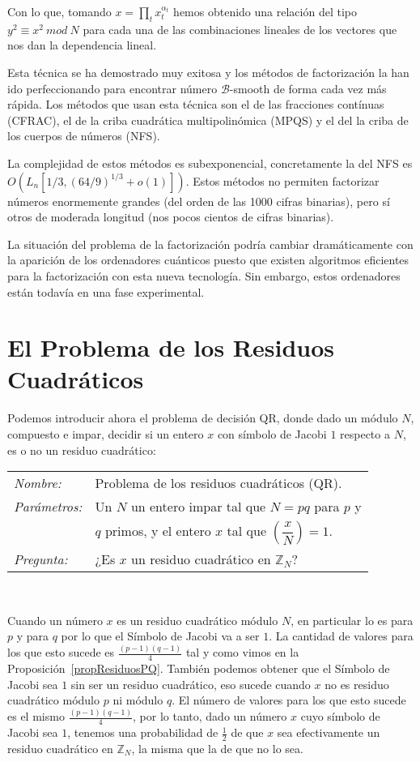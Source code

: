 Con lo que, tomando $x = \prod_t x_t^{\alpha_t}$ hemos obtenido una relaci\'on del tipo $y^2 \equiv x^2~mod~N$ para cada una de las combinaciones lineales de los
vectores que nos dan la dependencia lineal.

Esta t\'ecnica se ha demostrado muy exitosa y los m\'etodos de factorizaci\'on la han ido perfeccionando para encontrar n\'umero ${\mathcal B}$-smooth de forma cada
vez m\'as r\'apida. Los m\'etodos que usan esta t\'ecnica son el de las fracciones cont\'inuas (CFRAC), el de la criba cuadr\'atica multipolin\'omica (MPQS) y el del
la criba de los cuerpos de n\'umeros (NFS).

La complejidad de estos m\'etodos es subexponencial, concretamente la del NFS es $O(L_n[1/3,(64/9)^{1/3} + o(1)])$. Estos m\'etodos no permiten factorizar n\'umeros
enormemente grandes (del orden de las 1000 cifras binarias), pero s\'i otros de moderada longitud (nos pocos cientos de cifras binarias).

La situaci\'on del problema de la factorizaci\'on podr\'ia cambiar dram\'aticamente con la aparici\'on de los ordenadores cu\'anticos puesto que existen algoritmos
eficientes para la factorizaci\'on con esta nueva tecnolog\'ia. Sin embargo, estos ordenadores est\'an todav\'ia en una fase experimental.


\section{El Problema de los Residuos Cuadr\'aticos}

Podemos introducir ahora  el problema de decisión QR, donde dado un módulo $N$,
compuesto e impar, decidir si un entero $x$ con símbolo de Jacobi $1$ respecto
a $N$, es o no un residuo cuadrático:

\hfil

\begin{tabular}{|ll}
	\textit{Nombre:} & Problema de los residuos cuadr\'aticos (QR). \\
	\textit{Parámetros:} & Un $N$ un entero impar tal que $N = pq$ para $p$ y \\
	& $q$ primos, y el entero $x$ tal que $\left( \dfrac{x}{N} \right) = 1$. \\
	\textit{Pregunta:} & ¿Es $x$ un residuo cuadrático en ${\mathbb Z}_N$? \\
\end{tabular}
\\

\hfil

Cuando un n\'umero $x$ es un residuo cuadr\'atico m\'odulo $N$, en particular lo
es para $p$ y para $q$ por lo que el S\'imbolo de Jacobi va a ser $1$. La cantidad
de valores para los que esto sucede es $\frac{(p-1)(q-1)}{4}$ tal y como vimos en
la Proposici\'on~\ref{propResiduosPQ}. Tambi\'en podemos obtener que el S\'imbolo
de Jacobi sea $1$ sin ser un residuo cuadr\'atico, eso sucede cuando $x$ no es residuo
cuadr\'atico m\'odulo $p$ ni m\'odulo $q$. El n\'umero de valores para los que esto sucede
es el mismo $\frac{(p-1)(q-1)}{4}$, por lo tanto, dado un n\'umero $x$ cuyo s\'imbolo
de Jacobi sea $1$, tenemos una probabilidad de $\frac{1}{2}$ de que $x$ sea efectivamente
un residuo cuadr\'atico en ${\mathbb Z}_{N}$, la misma que la de que no lo sea.

